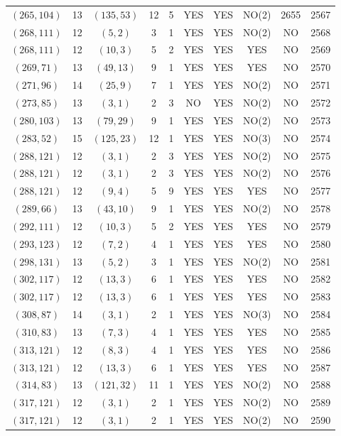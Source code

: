 \begin{longtable}{|c|c|c|c|c|c|c|c|c|c|}
$(265, 104)$ & 13 & $(135, 53)$ & 12 & 5 & YES & YES & NO(2) & 2655 & 2567\\
$(268, 111)$ & 12 & $(5, 2)$ & 3 & 1 & YES & YES & NO(2) & NO & 2568\\
$(268, 111)$ & 12 & $(10, 3)$ & 5 & 2 & YES & YES & YES & NO & 2569\\
$(269, 71)$ & 13 & $(49, 13)$ & 9 & 1 & YES & YES & YES & NO & 2570\\
$(271, 96)$ & 14 & $(25, 9)$ & 7 & 1 & YES & YES & NO(2) & NO & 2571\\
$(273, 85)$ & 13 & $(3, 1)$ & 2 & 3 & NO & YES & NO(2) & NO & 2572\\
$(280, 103)$ & 13 & $(79, 29)$ & 9 & 1 & YES & YES & NO(2) & NO & 2573\\
$(283, 52)$ & 15 & $(125, 23)$ & 12 & 1 & YES & YES & NO(3) & NO & 2574\\
$(288, 121)$ & 12 & $(3, 1)$ & 2 & 3 & YES & YES & NO(2) & NO & 2575\\
$(288, 121)$ & 12 & $(3, 1)$ & 2 & 3 & YES & YES & NO(2) & NO & 2576\\
$(288, 121)$ & 12 & $(9, 4)$ & 5 & 9 & YES & YES & YES & NO & 2577\\
$(289, 66)$ & 13 & $(43, 10)$ & 9 & 1 & YES & YES & NO(2) & NO & 2578\\
$(292, 111)$ & 12 & $(10, 3)$ & 5 & 2 & YES & YES & YES & NO & 2579\\
$(293, 123)$ & 12 & $(7, 2)$ & 4 & 1 & YES & YES & YES & NO & 2580\\
$(298, 131)$ & 13 & $(5, 2)$ & 3 & 1 & YES & YES & NO(2) & NO & 2581\\
$(302, 117)$ & 12 & $(13, 3)$ & 6 & 1 & YES & YES & YES & NO & 2582\\
$(302, 117)$ & 12 & $(13, 3)$ & 6 & 1 & YES & YES & YES & NO & 2583\\
$(308, 87)$ & 14 & $(3, 1)$ & 2 & 1 & YES & YES & NO(3) & NO & 2584\\
$(310, 83)$ & 13 & $(7, 3)$ & 4 & 1 & YES & YES & YES & NO & 2585\\
$(313, 121)$ & 12 & $(8, 3)$ & 4 & 1 & YES & YES & YES & NO & 2586\\
$(313, 121)$ & 12 & $(13, 3)$ & 6 & 1 & YES & YES & YES & NO & 2587\\
$(314, 83)$ & 13 & $(121, 32)$ & 11 & 1 & YES & YES & NO(2) & NO & 2588\\
$(317, 121)$ & 12 & $(3, 1)$ & 2 & 1 & YES & YES & NO(2) & NO & 2589\\
$(317, 121)$ & 12 & $(3, 1)$ & 2 & 1 & YES & YES & NO(2) & NO & 2590\\

\end{longtable}
